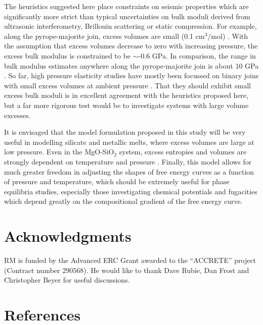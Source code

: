 \documentclass[review]{elsarticle}
\begin{document}
The heuristics suggested here place constraints on seismic properties which are significantly more strict than typical uncertainties on bulk moduli derived from ultrasonic interferometry, Brillouin scattering or static compression. For example, along the pyrope-majorite join, excess volumes are small (0.1 cm$^3$/mol) \citep{HSSR1997}. With the assumption that excess volumes decrease to zero with increasing pressure, the excess bulk modulus is constrained to be $\sim$-0.6 GPa. In comparison, the range in bulk modulus estimates anywhere along the pyrope-majorite join is about 10 GPa \citep[see, for example][]{HDLWB2010}. So far, high pressure elasticity studies have mostly been focussed on binary joins with small excess volumes at ambient pressure \citep{FXMLX2015, HC2014}. That they should exhibit small excess bulk moduli is in excellent agreement with the heuristics proposed here, but a far more rigorous test would be to investigate systems with large volume excesses.

It is envisaged that the model formulation proposed in this study will be very useful in modelling silicate and metallic melts, where excess volumes are large at low pressure. Even in the MgO-SiO$_2$ system, excess entropies and volumes are strongly dependent on temperature and pressure \citep{DKS2013}. Finally, this model allows for much greater freedom in adjusting the shapes of free energy curves as a function of pressure and temperature, which should be extremely useful for phase equilibria studies, especially those investigating chemical potentials and fugacities which depend greatly on the compositional gradient of the free energy curve.


\section{Acknowledgments}
RM is funded by the Advanced ERC Grant awarded to the ``ACCRETE'' project (Contract number 290568). He would like to thank Dave Rubie, Dan Frost and Christopher Beyer for useful discussions.
\clearpage
\section*{References}


\end{document}
